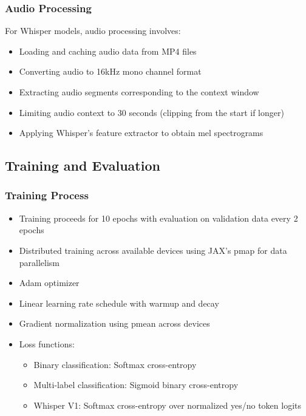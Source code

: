 \documentclass[10pt,twocolumn]{article}
\begin{document}
\subsubsection{Audio Processing}
For Whisper models, audio processing involves:
\begin{itemize}
    \item Loading and caching audio data from MP4 files
    \item Converting audio to 16kHz mono channel format
    \item Extracting audio segments corresponding to the context window
    \item Limiting audio context to 30 seconds (clipping from the start if longer)
    \item Applying Whisper's feature extractor to obtain mel spectrograms
\end{itemize}

\subsection{Training and Evaluation}

\subsubsection{Training Process}
\begin{itemize}
    \item Training proceeds for 10 epochs with evaluation on validation data every 2 epochs
    \item Distributed training across available devices using JAX's pmap for data parallelism
    \item Adam optimizer
    \item Linear learning rate schedule with warmup and decay
    \item Gradient normalization using pmean across devices
    \item Loss functions:
    \begin{itemize}
        \item Binary classification: Softmax cross-entropy
        \item Multi-label classification: Sigmoid binary cross-entropy
        \item Whisper V1: Softmax cross-entropy over normalized yes/no token logits \end{itemize}
\end{itemize}
\end{document}
